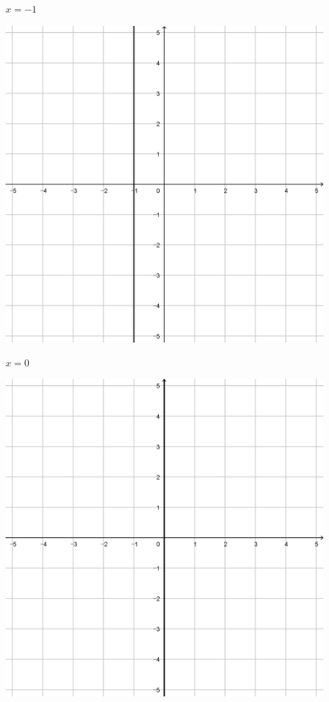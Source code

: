 \documentclass[a4paper]{oblivoir}
\begin{document}
\clearpage
\begin{minipage}{0.45\textwidth}\centering
\(x=-1\)
\par\bigskip\includegraphics[width=0.9\textwidth]{img/1_line_29}
\end{minipage}
\begin{minipage}{0.45\textwidth}\centering
\(x=0\)
\par\bigskip\includegraphics[width=0.9\textwidth]{img/1_line_30}
\end{minipage}\bigskip\bigskip\par
\end{document}
